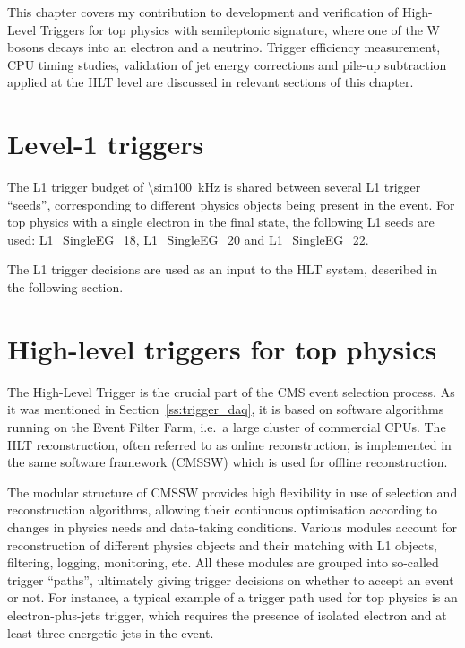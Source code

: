 This chapter covers my contribution to development and verification of High-Level Triggers for top physics with
semileptonic signature, where one of the W bosons decays into an electron and a neutrino. Trigger efficiency
measurement, CPU timing studies, validation of jet energy corrections and pile-up subtraction applied at the HLT level
are discussed in relevant sections of this chapter.

\section{Level-1 triggers}
The L1 trigger budget of \SI{\sim100}{\kilo\hertz} is shared between several L1 trigger ``seeds'', corresponding to
different physics objects being present in the event. For top physics with a single electron in the final state, the
following L1 seeds are used: L1\_SingleEG\_18, L1\_SingleEG\_20 and L1\_SingleEG\_22.


The L1 trigger decisions are used as an input to the HLT system, described in the following section.

\clearpage

\section{High-level triggers for top physics}

The High-Level Trigger \cite{HLT} is the crucial part of the CMS event selection process. As it was mentioned in
Section~\ref{ss:trigger_daq}, it is based on software algorithms running on the Event Filter Farm, i.e.\ a large cluster
of commercial CPUs. The HLT reconstruction, often referred to as online reconstruction, is implemented in the same
software framework (CMSSW) which is used for offline reconstruction.

The modular structure of CMSSW provides high flexibility in use of selection and reconstruction algorithms, allowing
their continuous optimisation according to changes in physics needs and data-taking conditions. Various modules account
for reconstruction of different physics objects and their matching with L1 objects, filtering, logging, monitoring, etc.
All these modules are grouped into so-called trigger ``paths'', ultimately giving trigger decisions on whether to accept
an event or not. For instance, a typical example of a trigger path used for top physics is an electron-plus-jets
trigger, which requires the presence of isolated electron and at least three energetic jets in the event.

